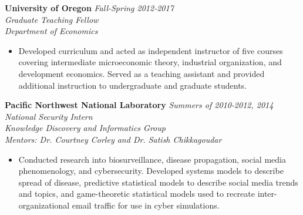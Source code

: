 \documentclass[11pt]{article}
\newenvironment{changemargin}[2]{%
  \begin{list}{}{%
    \setlength{\topsep}{0pt}%
    \setlength{\leftmargin}{#1}%
    \setlength{\rightmargin}{#2}%
    \setlength{\listparindent}{\parindent}%
    \setlength{\itemindent}{\parindent}%
    \setlength{\parsep}{\parskip}%
  }%
  \item[]}{\end{list}
}
\newenvironment{body} {
	\vspace*{-16pt}
	\begin{changemargin}{-0.25in}{-0.5in}
  }	
	{\end{changemargin}
}
\begin{document}
\begin{body}
	
	\textbf{University of Oregon} \hfill \emph{Fall-Spring 2012-2017}\\
	\emph{Graduate Teaching Fellow}\\
	\emph{Department of Economics}
	\vspace*{-4pt}
	\begin{itemize}
		\item Developed curriculum and acted as independent instructor of five courses covering intermediate microeconomic theory, industrial organization, and development economics. Served as a teaching assistant and provided additional instruction to undergraduate and graduate students.
	\end{itemize}

	\textbf{Pacific Northwest National Laboratory}  \hfill \emph{Summers of 2010-2012, 2014}\\
	\emph{National Security Intern}\\ 
	\emph{Knowledge Discovery and Informatics Group}\\
	\emph{Mentors: Dr. Courtney Corley and Dr. Satish Chikkagoudar}
	\vspace*{-4pt}
	\begin{itemize}	
		\item Conducted research into biosurveillance, disease propagation, social media phenomenology, and cybersecurity. Developed systems models to describe spread of disease, predictive statistical models to describe social media trends and topics, and game-theoretic statistical models used to recreate inter-organizational email traffic for use in cyber simulations.
	\end{itemize}
				
\end{body}
\end{document}
